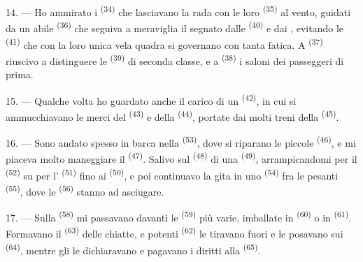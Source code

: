 \VUsaut{4.0mm}
\VUsaut{3.0mm}

14. --- Ho ammirato i  \textsuperscript{(34)} che lasciavano la
rada con le loro  \textsuperscript{(35)} al vento, guidati da un
abile  \textsuperscript{(36)} che seguiva a meraviglia il
 segnato dalle  \textsuperscript{(40)} e dai
, evitando le  \textsuperscript{(41)} che con la loro
unica vela quadra si governano con tanta fatica. A 
\textsuperscript{(37)} riuscivo a distinguere le 
\textsuperscript{(39)} di seconda classe, e a  \textsuperscript{(38)} i
saloni dei passeggeri di prima.

15. --- Qualche volta ho guardato anche il carico di un 
\textsuperscript{(42)}, in cui si ammucchiavano le merci del 
\textsuperscript{(43)} e della  \textsuperscript{(44)},
portate dai molti treni della 
\textsuperscript{(45)}.

\VUsaut{3.0mm}
\VUsaut{3.0mm}

16. --- Sono andato spesso in barca nella  \textsuperscript{(53)}, dove
si riparano le piccole  \textsuperscript{(46)}, e mi piaceva molto
maneggiare il  \textsuperscript{(47)}. Salivo sul 
\textsuperscript{(48)} di una  \textsuperscript{(49)},
arrampicandomi per il  \textsuperscript{(52)} su per l'
\textsuperscript{(51)} fino ai  \textsuperscript{(50)}, e poi
continuavo la gita in uno  \textsuperscript{(54)} fra le pesanti
 \textsuperscript{(55)}, dove le 
\textsuperscript{(56)} stanno ad asciugare.

17. --- Sulla  \textsuperscript{(58)} mi passavano davanti le
 \textsuperscript{(59)} più varie, imballate in 
\textsuperscript{(60)} o in  \textsuperscript{(61)}. Formavano il
 \textsuperscript{(63)} delle chiatte, e potenti 
\textsuperscript{(62)} le tiravano fuori e le posavano sui 
\textsuperscript{(64)}, mentre gli  le dichiaravano e pagavano i
diritti alla  \textsuperscript{(65)}.


